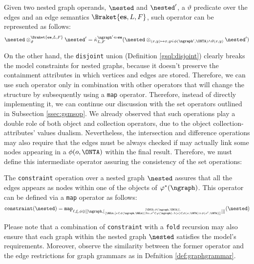 \begin{definition}
	Given two nested graph operands, $\nested$ and $\nested'$, a $\vartheta$ predicate over the edges and an edge semantics $\Braket{\textbf{es},L,F}$, such operator can be represented as follows:
	\[\nested\otimes_\vartheta^{\Braket{\textbf{es},L,F}}\nested'=\dot\kappa^{\ngraph'\Leftarrow\textbf{es}}_{L,F}(\nested\otimes_{(x,y)\mapsto x,y\in\phi(\ngraph',\ONTA)\wedge\vartheta(x,y)}\nested')\]
\end{definition}


On the other hand, the \texttt{disjoint} union (Definition \vref{gsql:disjoint}) clearly breaks the model constraints for nested graphs, because it doesn't preserve the containment attributes in which vertices and edges are stored. Therefore, we can use such operator only in combination with other operators that will change the structure by subsequently using a \texttt{map} operator. Therefore, instead of directly implementing it, we can continue our discussion with the set operators outlined in Subsection \vref{ssec:gsmsop}. We already observed that such operations play a double role of both object and collection operators, due to the object collection-attributes' values dualism. Nevertheless, the intersection and difference operations may also require that the edges must be always checked if may actually link some nodes appearing in a $\phi(o,\ONTA)$ within the final result. Therefore, we must define this intermediate operator assuring the consistency of the set operations:

\begin{definition}
The \texttt{constraint} operation over a nested graph $\nested$ assures that all the edges appears as nodes within one of the objects of $\varphi^*(\ngraph)$. This operator can be defined via a \texttt{map} operator as follows:
\[\texttt{constraint}(\nested)=\texttt{map}_{\ell,\xi,\phi\oplus [[\ngraph,[\genfrac{}{}{0pt}{}{[\ONTA,\phi(\ngraph,\ONTA)],}{[\RELA,[e\in\phi(\ngraph,\RELA)|\exists o,o'\in \varphi(\ngraph).\lambda(e)\in\phi(o,\ONTA)\times\phi(o',\ONTA) ]]}]]]}(\nested)\]
\end{definition}

Please note that a combination of \texttt{constraint} with a \texttt{fold} recursion may also ensure that each graph within the nested graph $\nested$ satisfies the model's requirements. Moreover, observe the similarity between the former operator and the edge restrictions for graph grammars as in Defnition \vref{def:graphgrammar}.

